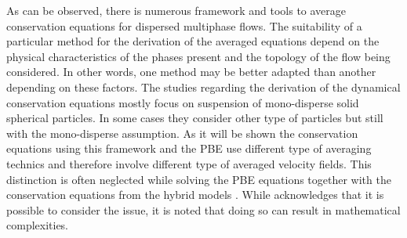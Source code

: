 As can be observed, there is numerous framework and tools to average conservation equations for dispersed multiphase flows. 
The suitability of a particular method for the derivation of the averaged equations depend on the physical characteristics of the phases present and the topology of the flow being considered.
In other words, one method may be better adapted than another depending on these factors.
The studies regarding the derivation of the dynamical conservation equations mostly focus on suspension of mono-disperse solid spherical particles.
In some cases they consider other type of particles but still with the mono-disperse assumption.  
As it will be shown the conservation equations using this framework and the PBE use different type of averaging technics and therefore involve different type of averaged velocity fields.
This distinction is often neglected while solving the PBE equations together with the conservation equations from the hybrid models \citet{KAMP20011363}.
While \citep{zaepffel2011modelisation} acknowledges that it is possible to consider the issue, it is noted that doing so can result in mathematical complexities.

